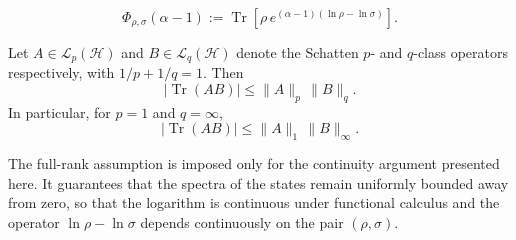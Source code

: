 \documentclass[10pt,a4paper]{amsart}
\begin{document}
\begin{equation}\label{Geneq}
\Phi_{\rho,\sigma}(\alpha-1):=\operatorname{Tr}\!\left[ \rho\,e^{(\alpha-1)(\ln\rho-\ln\sigma)}\right].
\end{equation}

\begin{lemma}\label{Lem1}
Let $A \in \mathcal{L}_p(\mathcal{H})$ and $B \in \mathcal{L}_q(\mathcal{H})$ denote 
the Schatten $p$- and $q$-class operators respectively, with $1/p + 1/q = 1$.
Then
\begin{equation}
    \big|\operatorname{Tr}(AB)\big| \le \|A\|_p \, \|B\|_q.
\end{equation}
In particular, for $p=1$ and $q=\infty$,
\begin{equation}
    \big|\operatorname{Tr}(AB)\big| \le \|A\|_1 \, \|B\|_\infty.
\end{equation}
\end{lemma}

\begin{remark}
The full-rank assumption is imposed only for the continuity argument presented here.
It guarantees that the spectra of the states remain uniformly bounded away from zero, so that the logarithm is continuous under functional calculus and the operator \(\ln\rho-\ln\sigma\)
depends continuously on the pair \((\rho,\sigma).\)
\end{remark}
\end{document}
